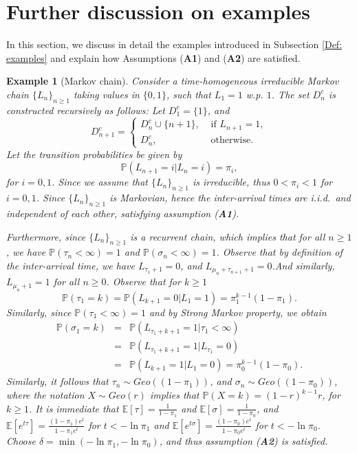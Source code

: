\documentclass{article}
\numberwithin{equation}{section}
\newtheorem{example}[theorem]{Example}
\newcommand{\1}{\mathbf{1}}
\newcommand{\0}{\mathbf{0}}
\newcommand{\PP}{\mbox{${\mathbb P}$}}
\newcommand{\E}{\mbox{${\mathbb E}$}}
\begin{document}
\section{Further discussion on examples} \label{sec: Examples}
In this section, we discuss in detail the examples introduced in Subsection \ref{Def: examples} and explain how Assumptions (\textbf{A1}) and (\textbf{A2}) are satisfied. 
\begin{example}[Markov chain]
Consider a time-homogeneous irreducible Markov chain $\{L_n\}_{n \ge 1}$ taking values in $\{0, 1\}$, such that $L_1=1$ w.p. $1$. The set $D^c_n$ is constructed recursively as follows: Let $D^c_1 = \{1\}$, and 
\begin{equation}
\label{Eq: Def_D_n}
D^c_{n+1}= \begin{cases}
D^c_n \cup \{n+1\}, & \text{ if } L_{n+1}=1,\\
D^c_n, & \text{ otherwise.}
\end{cases}
\end{equation}
Let the transition probabilities be given by 
\begin{equation*}
\PP\left(L_{n+1}=i \Big \vert L_n=i\right)=\pi_i, 
\end{equation*}
for $i=0,1$. Since we assume that $\{L_n\}_{n \ge 1}$ is irreducible, thus $0< \pi_i <1$ for $i=0,1$. Since $\{L_n\}_{ n\ge 1}$ is Markovian, hence the inter-arrival times are i.i.d.\, and independent of each other, satisfying assumption (\textbf{A1}).

Furthermore, since $\{L_n\}_{n \ge 1}$ is a recurrent chain, which implies that for all $n \ge 1$, we have $\PP \left(\tau_n < \infty\right)=1$ and $\PP \left(\sigma_n < \infty\right)=1$. Observe that by definition of the inter-arrival time, we have $L_{\tau_1+1}=0$, and $L_{\mu_n+\tau_{n+1}+1}=0$.And similarly, $L_{\mu_n+1}=1$ for all $n \ge 0$.  Observe that for $k \ge 1$
\[
\PP \left(\tau_1 =k \right)= \PP \left(L_{k+1}=0 \Big \vert L_1=1\right)= \pi_1^{k-1} (1-\pi_1).
\]
Similarly, since $\PP \left(\tau_1 < \infty \right)=1$ and by Strong Markov property, we obtain 
\begin{eqnarray*}
\PP \left(\sigma_1 =k \right) & = & \PP \left(L_{\tau_1+k+1}=1 \Big \vert \tau_1 <\infty\right)\\
& = & \PP \left(L_{\tau_1+k+1}=1 \Big \vert L_{\tau_1 }=0\right)\\
& = & \PP \left(L_{k+1}=1 \Big \vert L_{1}=0\right)=\pi_0^{k-1} (1-\pi_0).
\end{eqnarray*}
Similarly, it follows that $\tau_n \sim Geo((1-\pi_1))$, and $\sigma_n \sim Geo((1-\pi_0))$, where the notation $X \sim Geo(r)$ implies that $\PP\left(X=k\right)= (1-r)^{k-1}r$, for $k \ge 1$. It is immediate that $\E \left[\tau \right]= \frac{1}{1-\pi_1}$ and $\E \left[\sigma \right]= \frac{1}{1-\pi_0}$, and $\E[e^{t\tau}] = \frac{(1-\pi_1)e^t}{1-\pi_1 e^t}$ for $t < - \ln \pi_1$ and $\E[e^{t\sigma}] = \frac{(1-\pi_0)e^t}{1-\pi_0 e^t}$ for $t < - \ln \pi_0$. Choose $\delta = \min (- \ln \pi_1, - \ln \pi_0)$, and thus assumption (\textbf{A2}) is satisfied.
\end{example}
\end{document}
